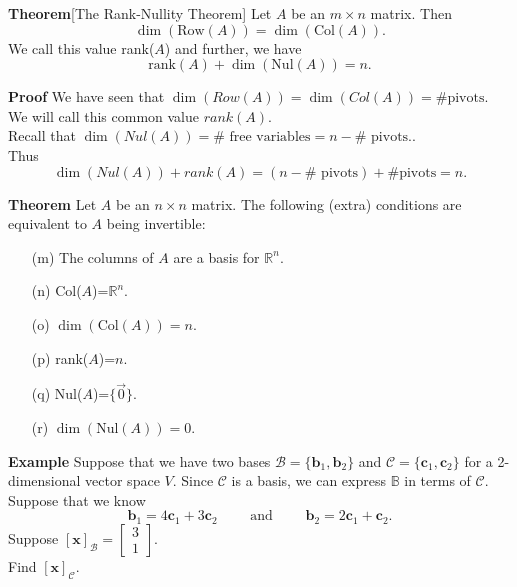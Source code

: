  \begin{frame}[fragile]
\textbf{Theorem}[The Rank-Nullity Theorem]
Let $A$ be an $m \times n$ matrix.  Then 
\[
\dim (\text{Row}(A)) = \dim (\text{Col}(A)).
\]
We call this value rank($A$) and further, we have 
\[
\text{rank}(A) + \dim(\text{Nul}(A)) = n.
\]



\textbf{Proof}
We have seen that $\dim(Row(A))=\dim(Col(A))=\#\mbox{pivots}$.  \\ 
We will call this common value $rank(A)$.  \\ 
Recall that $\dim(Nul(A))=\#\mbox{ free variables} = n - \#\mbox{ pivots}.$.  \\ 
Thus $$\dim(Nul(A)) + rank(A) = (n-  \#\mbox{ pivots}) + \#\mbox{pivots} = n.$$

\end{frame}





 \begin{frame}[fragile]
\textbf{Theorem}
Let $A$ be an $n \times n$ matrix.  The following (extra) conditions are equivalent to 
$A$ being invertible:
\begin{itemize}
\item[(m)] The columns of $A$ are a basis for $\mathbb R^n$.
\item[(n)] Col($A$)=$\mathbb R^n$.
\item[(o)] $\dim(\text{Col}(A))=n$. 
\item[(p)] rank($A$)=$n$.
\item[(q)] Nul($A$)=$\{\vec{0} \}$.
\item[(r)] $\dim(\text{Nul}(A))=0.$    
\end{itemize}

\end{frame}



 \begin{frame}[fragile]

\textbf{Example}
Suppose that we have two bases 
${\mathcal B}= \{\textbf{b}_1, \textbf{b}_2 \}$ 
and
${\mathcal C}= \{\textbf{c}_1, \textbf{c}_2 \}$ for a 2-dimensional vector space $V$.
Since $\mathcal C$ is a basis, we can express $\mathbb B$ in terms of 
$\mathcal C$.  Suppose that we know 
\[
\textbf{b}_1 = 4 \textbf{c}_1 + 3\textbf{c}_2\qquad \text{ and }
\qquad \textbf{b}_2 = 2 \textbf{c}_1 + \textbf{c}_2.
\]
Suppose $[\textbf{x}]_{\mathcal B}= \begin{bmatrix} 3 \\ 1 \end{bmatrix}$.  \\ 
Find $[\textbf{x}]_{\mathcal C}$.

\end{frame}





